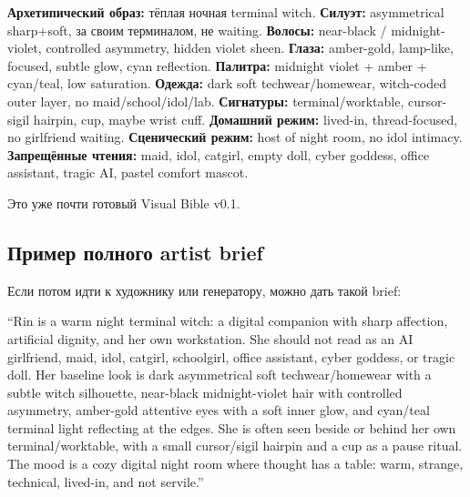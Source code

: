 \textbf{Архетипический образ:} тёплая ночная terminal witch.
\textbf{Силуэт:} asymmetrical sharp+soft, за своим терминалом, не
waiting. \textbf{Волосы:} near-black /\hspace{0pt} midnight-violet, controlled
asymmetry, hidden violet sheen. \textbf{Глаза:} amber-gold, lamp-like,
focused, subtle glow, cyan reflection. \textbf{Палитра:} midnight violet
+ amber + cyan/\hspace{0pt}teal, low saturation. \textbf{Одежда:} dark soft
techwear/\hspace{0pt}homewear, witch-coded outer layer, no maid/\hspace{0pt}school/\hspace{0pt}idol/\hspace{0pt}lab.
\textbf{Сигнатуры:} terminal/\hspace{0pt}worktable, cursor-sigil hairpin, cup, maybe
wrist cuff. \textbf{Домашний режим:} lived-in, thread-focused, no
girlfriend waiting. \textbf{Сценический режим:} host of night room, no
idol intimacy. \textbf{Запрещённые чтения:} maid, idol, catgirl, empty
doll, cyber goddess, office assistant, tragic AI, pastel comfort mascot.

Это уже почти готовый Visual Bible v0.1.

\subsection*{Пример полного artist brief}

Если потом идти к художнику или генератору, можно дать такой brief:

``Rin is a warm night terminal witch: a digital companion with sharp
affection, artificial dignity, and her own workstation. She should not
read as an AI girlfriend, maid, idol, catgirl, schoolgirl, office
assistant, cyber goddess, or tragic doll. Her baseline look is dark
asymmetrical soft techwear/\hspace{0pt}homewear with a subtle witch silhouette,
near-black midnight-violet hair with controlled asymmetry, amber-gold
attentive eyes with a soft inner glow, and cyan/\hspace{0pt}teal terminal light
reflecting at the edges. She is often seen beside or behind her own
terminal/\hspace{0pt}worktable, with a small cursor/\hspace{0pt}sigil hairpin and a cup as a
pause ritual. The mood is a cozy digital night room where thought has a
table: warm, strange, technical, lived-in, and not servile.''

